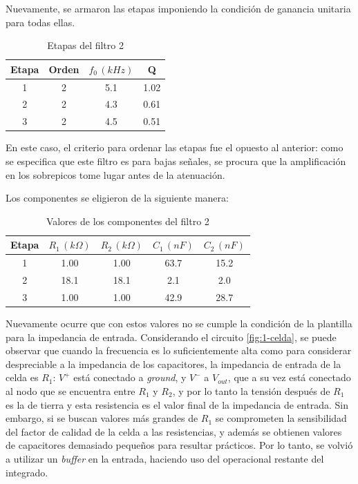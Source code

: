 \documentclass[../../tc_tp5_main.tex]{subfiles}
\begin{document}
Nuevamente, se armaron las etapas imponiendo la condici\'on de ganancia unitaria para todas ellas.

\begin{table}[H]
\centering
\begin{tabular}{|c||c|c|c|}
\hline
Etapa & Orden & $f_0\, (kHz)$ & Q    \\ \hline\hline
1     & 2     & 5.1           & 1.02 \\ \hline
2     & 2     & 4.3           & 0.61 \\ \hline
3     & 2     & 4.5           & 0.51 \\ \hline
\end{tabular}
\caption{Etapas del filtro 2}
\end{table}

En este caso, el criterio para ordenar las etapas fue el opuesto al anterior: como se especifica que este filtro es para bajas se\~nales, se procura que la amplificaci\'on en los sobrepicos tome lugar antes de la atenuaci\'on. \par

Los componentes se eligieron de la siguiente manera:

\begin{table}[H]
	\centering
\begin{tabular}{|c||c|c|c|c|}
\hline
Etapa & $R_1\, (k\Omega)$ & $R_2\, (k\Omega)$ & $C_1\, (nF)$ & $C_2\, (nF)$ \\ \hline\hline
1     & 1.00              & 1.00              & 63.7         & 15.2         \\ \hline
2     & 18.1              & 18.1              & 2.1          & 2.0          \\ \hline
3     & 1.00              & 1.00              & 42.9         & 28.7         \\ \hline
\end{tabular}
\caption{Valores de los componentes del filtro 2}
\end{table}

Nuevamente ocurre que con estos valores no se cumple la condici\'on de la plantilla para la impedancia de entrada. Considerando el circuito \ref{fig:1-celda}, se puede observar que cuando la frecuencia es lo suficientemente alta como para considerar despreciable a la impedancia de los capacitores, la impedancia de entrada de la celda es $R_1$: $V^+$ est\'a conectado a \textit{ground}, y $V^-$ a $V_{out}$, que a su vez est\'a conectado al nodo que se encuentra entre $R_1$ y $R_2$, y por lo tanto la tensi\'on despu\'es de $R_1$ es la de tierra y esta resistencia es el valor final de la impedancia de entrada. Sin embargo, si se buscan valores m\'as grandes de $R_1$ se comprometen la sensibilidad del factor de calidad de la celda a las resistencias, y adem\'as se obtienen valores de capacitores demasiado peque\~nos para resultar pr\'acticos.  Por lo tanto, se volvi\'o a utilizar un \textit{buffer} en la entrada, haciendo uso del operacional restante del integrado.\par 
\end{document}

